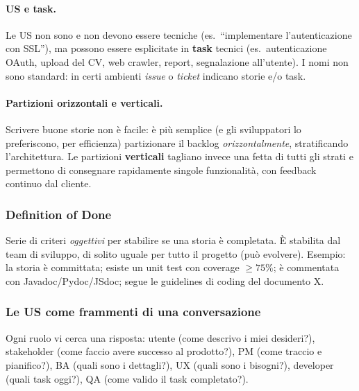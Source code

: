 \documentclass[a4paper,12pt]{article}
\begin{document}
\paragraph{US e task.} Le US non sono e non devono essere tecniche (es.\ ``implementare
l'autenticazione con SSL''), ma possono essere esplicitate in \textbf{task} tecnici (es.\
autenticazione OAuth, upload del CV, web crawler, report, segnalazione all'utente). I
nomi non sono standard: in certi ambienti \emph{issue} o \emph{ticket} indicano storie
e/o task.

\paragraph{Partizioni orizzontali e verticali.} Scrivere buone storie non è facile: è
più semplice (e gli sviluppatori lo preferiscono, per efficienza) partizionare il backlog
\emph{orizzontalmente}, stratificando l'architettura. Le partizioni \textbf{verticali}
tagliano invece una fetta di tutti gli strati e permettono di consegnare rapidamente
singole funzionalità, con feedback continuo dal cliente.

\subsubsection{Definition of Done}
Serie di criteri \emph{oggettivi} per stabilire se una storia è completata. È stabilita
dal team di sviluppo, di solito uguale per tutto il progetto (può evolvere). Esempio: la
storia è committata; esiste un unit test con coverage $\geq 75\%$; è commentata con
Javadoc/Pydoc/JSdoc; segue le guidelines di coding del documento X.

\subsubsection{Le US come frammenti di una conversazione}
Ogni ruolo vi cerca una risposta: utente (come descrivo i miei desideri?), stakeholder
(come faccio avere successo al prodotto?), PM (come traccio e pianifico?), BA (quali
sono i dettagli?), UX (quali sono i bisogni?), developer (quali task oggi?), QA (come
valido il task completato?).
\end{document}
